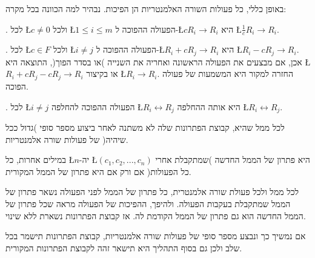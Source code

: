 \begin{remark}
באופן כללי, כל פעולות השורה האלמנטריות הן הפיכות. נבהיר למה
הכוונה בכל מקרה:

{\endL}. לכל \L{$c\neq0$} ולכל \L{$1\leq i\leq m$} הפעולה
ההפוכה ל-\L{$cR_{i}\rightarrow R_{i}$} היא \L{$\frac{1}{c}R_{i}\rightarrow R_{i}$}.

{\endL}. לכל \L{$c\in F$} ולכל \L{$i\neq j$} הפעולה ההפוכה
ל-\L{$R_{i}+cR_{j}\rightarrow R_{i}$} היא \L{$R_{i}-cR_{j}\rightarrow R_{i}$}.
אכן, אם מבצעים את הפעולה הראשונה ואחריה את השנייה )או בסדר הפוך(,
התוצאה היא \L{$R_{i}+cR_{j}-cR_{j}\rightarrow R_{i}$} או בקיצור \L{$R_{i}\to R_{i}$}.
החזרה למקור היא המשמעות של פעולה הפוכה.

{\endL}. לכל \L{$i\neq j$} הפעולה ההפוכה להחלפה \L{$R_{i}\leftrightarrow R_{j}$}
היא אותה ההחלפה \L{$R_{i}\leftrightarrow R_{j}$}.
\end{remark}

\begin{prop}
לכל ממ\textquotedbl ל שהיא, קבוצת הפתרונות שלה לא משתנה לאחר
ביצוע מספר סופי )גדול ככל שיהיה( של פעולות שורה אלמנטריות.
\end{prop}

במילים אחרות, כל \L{$n$}-יה \L{$(c_{1},c_{2},...,c_{n})$} היא פתרון
של הממ\textquotedbl ל החדשה )שמתקבלת אחרי כל הפעולות( אם ורק אם היא
פתרון של הממ\textquotedbl ל המקורית.

\begin{hproof}
לכל ממ\textquotedbl ל ולכל פעולת שורה אלמנטרית, כל פתרון של
הממ\textquotedbl ל לפני הפעולה נשאר פתרון של הממ\textquotedbl ל
שמתקבלת בעקבות הפעולה. ולהיפך, ההפיכות של הפעולה מראה שכל פתרון של
הממ\textquotedbl ל החדשה הוא גם פתרון של הממ\textquotedbl ל הקודמת
לה. אז קבוצת הפתרונות נשארת ללא שינוי.

אם נמשיך כך ונבצע מספר סופי של פעולות שורה אלמנטריות, קבוצת הפתרונות
תישמר בכל שלב ולכן גם בסוף התהליך היא תישאר זהה לקבוצת הפתרונות המקורית.
\end{hproof}

